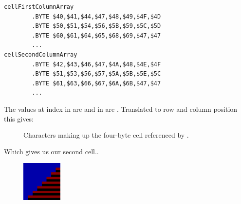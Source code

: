 \begin{lstlisting}
cellFirstColumnArray
        .BYTE $40,$41,$44,$47,$48,$49,$4F,$4D
        .BYTE $50,$51,$54,$56,$5B,$59,$5C,$5D
        .BYTE $60,$61,$64,$65,$68,$69,$47,$47
        ...
cellSecondColumnArray   
        .BYTE $42,$43,$46,$47,$4A,$48,$4E,$4F
        .BYTE $51,$53,$56,$57,$5A,$5B,$5E,$5C
        .BYTE $61,$63,$66,$67,$6A,$6B,$47,$47
        ...
\end{lstlisting}

The values at index  in  are  and
in  are . Translated to row and column position
this gives:

\begin{figure}[H]                          
{                                          
  \setlength{\tabcolsep}{3.0pt}            
  \setlength\cmidrulewidth{\lightrulewidth}
    \begin{adjustbox}{width=5cm,center}
\begin{subfigure}{0.12\textwidth}

\end{subfigure}
\begin{subfigure}{0.12\textwidth}

\end{subfigure}
    \end{adjustbox}
    \begin{adjustbox}{width=5cm,center}
\begin{subfigure}{0.12\textwidth}

\end{subfigure}
\begin{subfigure}{0.12\textwidth}

\end{subfigure}
    \end{adjustbox}
  }\caption[]{Characters making up the four-byte cell referenced by .}
\end{figure}

Which gives us our second cell..
\begin{figure}[H]
  {
    \begin{adjustbox}{width=2cm,center}
        \includegraphics[width=2cm]{src/bonusphase/row21_cell1.png}%
    \end{adjustbox}
  }
\end{figure}

